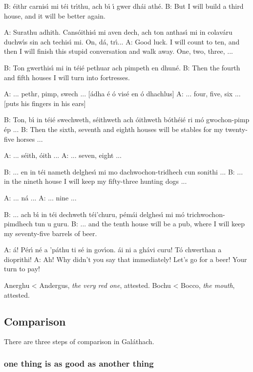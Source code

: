 B: \'{e}ithr carnis\'{\i} mi t\'{e}i tr\'{\i}thu, ach b\'{\i} \'{\i} gwer dh\'{a}i ath\'{e}.
B: But I will build a third house, and it will be better again.

A: Surathu adhith. Cans\'{o}ithis\'{\i} mi aven dech, ach ton anthas\'{\i} mi in colav\'{a}ru duchw\'{\i}s sin ach techis\'{\i} mi. On, d\'{a}, tr\'{\i}... 
A: Good luck. I will count to ten, and then I will finish this stupid conversation and walk away. One, two, three, ... 

B: Ton gwerthis\'{\i} mi in t\'{e}i\'{e} pethuar ach pimpeth en dhun\'{e}.
B: Then the fourth and fifth houses I will turn into fortresses.

A: ... pethr, pimp, swech ... [\'{a}dha \'{e} \'{o} vis\'{e} en \'{o} dhachlus]
A: ... four, five, six ... [puts his fingers in his ears]

B: Ton, b\'{\i} in t\'{e}i\'{e} swechweth, s\'{e}ithweth ach \'{o}ithweth b\'{o}th\'{e}i\'{e} ri m\'{o} gwochon-pimp \'{e}p ... 
B: Then the sixth, seventh and eighth houses will be stables for my twenty-five horses ...

A: ... s\'{e}ith, \'{o}ith ...
A: ... seven, eight ...

B: ... en in t\'{e}i nameth delghes\'{\i} mi mo dachwochon-tridhech cun sonithi ...
B: ... in the nineth house I will keep my fifty-three hunting dogs ...

A: ... n\'{a} ...
A: ... nine ...

B: ... ach b\'{\i} in t\'{e}i dechweth t\'{e}i'churu, p\'{e}m\'{a}i delghes\'{\i} mi m\'{o} trichwochon-pimdhech tun u guru.
B: ... and the tenth house will be a pub, where I will keep my seventy-five barrels of beer.

A: \'{a}! P\'{e}r\'{\i} n\'{e} a 'p\'{a}thu ti s\'{e} in gov\'{\i}on. \'{a}i ni a gh\'{a}vi curu! T\'{o} chwerthan a dioprithi!
A: Ah! Why didn't you say that immediately! Let's go for a beer! Your turn to pay!

Anerghu < Andergus, \textit{the very red one}, attested.
Bochu < Bocco, \textit{the mouth}, attested.

\subsection{Comparison}

There are three steps of comparison in Gal\'{a}thach.

\subsubsection{one thing is as good as another thing}

